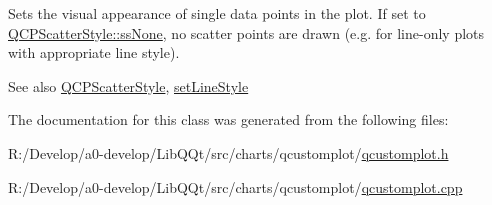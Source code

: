 Sets the visual appearance of single data points in the plot. If set to \mbox{\hyperlink{class_q_c_p_scatter_style_adb31525af6b680e6f1b7472e43859349abd144c291ca274f77053ec68cab6c022}{Q\+C\+P\+Scatter\+Style\+::ss\+None}}, no scatter points are drawn (e.\+g. for line-\/only plots with appropriate line style).

\begin{DoxySeeAlso}{See also}
\mbox{\hyperlink{class_q_c_p_scatter_style}{Q\+C\+P\+Scatter\+Style}}, \mbox{\hyperlink{class_q_c_p_curve_a4a377ec863ff81a1875c3094a6177c19}{set\+Line\+Style}} 
\end{DoxySeeAlso}


The documentation for this class was generated from the following files\+:\begin{DoxyCompactItemize}
\item 
R\+:/\+Develop/a0-\/develop/\+Lib\+Q\+Qt/src/charts/qcustomplot/\mbox{\hyperlink{qcustomplot_8h}{qcustomplot.\+h}}\item 
R\+:/\+Develop/a0-\/develop/\+Lib\+Q\+Qt/src/charts/qcustomplot/\mbox{\hyperlink{qcustomplot_8cpp}{qcustomplot.\+cpp}}\end{DoxyCompactItemize}
